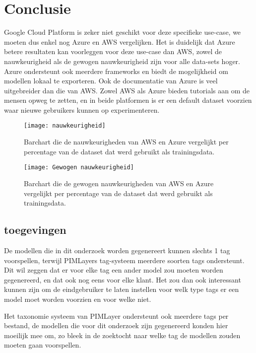 \chapter{Conclusie}%
\label{ch:conclusie}

Google Cloud Platform is zeker niet geschikt voor deze specifieke use-case, we moeten dus enkel nog Azure en AWS vergelijken.
Het is duidelijk dat Azure betere resultaten kan voorleggen voor deze use-case dan AWS, zowel de nauwkeurigheid als de gewogen nauwkeurigheid zijn voor alle data-sets hoger. Azure ondersteunt ook meerdere frameworks en biedt de mogelijkheid om modellen lokaal te exporteren. Ook de documentatie van Azure is veel uitgebreider dan die van AWS. Zowel AWS als Azure bieden tutorials aan om de mensen opweg te zetten, en in beide platformen is er een default dataset voorzien waar nieuwe gebruikers kunnen op experimenteren. 
\begin{figure}[h]
    \caption{Barchart die de nauwkeurigheden van AWS en Azure vergelijkt per percentage van de dataset dat werd gebruikt als trainingsdata.}
    \centering
    \texttt{[image: nauwkeurigheid]}
\end{figure}

\begin{figure}[h]
    \caption{Barchart die de gewogen nauwkeurigheden van AWS en Azure vergelijkt per percentage van de dataset dat werd gebruikt als trainingsdata.}
    \centering
    \texttt{[image: Gewogen nauwkeurigheid]}
\end{figure}


\section{toegevingen}
De modellen die in dit onderzoek worden gegenereert kunnen slechts 1 tag voorspellen, terwijl PIMLayers tag-systeem meerdere soorten tags ondersteunt. Dit wil zeggen dat er voor elke tag een ander model zou moeten worden gegenereerd, en dat ook nog eens voor elke klant. Het zou dan ook interessant kunnen zijn om de eindgebruiker te laten instellen voor welk type tags er een model moet worden voorzien en voor welke niet.

Het taxonomie systeem van PIMLayer ondersteunt ook meerdere tags per bestand, de modellen die voor dit onderzoek zijn gegenereerd konden hier moeilijk mee om, zo bleek in de zoektocht naar welke tag de modellen zouden moeten gaan voorspellen. 

